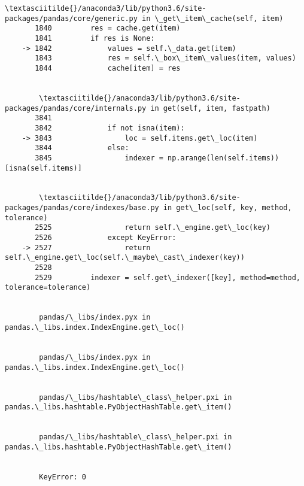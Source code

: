 \documentclass[11pt]{article}
\begin{document}
\begin{Verbatim}[commandchars=\\\{\}]
        \textasciitilde{}/anaconda3/lib/python3.6/site-packages/pandas/core/generic.py in \_get\_item\_cache(self, item)
       1840         res = cache.get(item)
       1841         if res is None:
    -> 1842             values = self.\_data.get(item)
       1843             res = self.\_box\_item\_values(item, values)
       1844             cache[item] = res


        \textasciitilde{}/anaconda3/lib/python3.6/site-packages/pandas/core/internals.py in get(self, item, fastpath)
       3841 
       3842             if not isna(item):
    -> 3843                 loc = self.items.get\_loc(item)
       3844             else:
       3845                 indexer = np.arange(len(self.items))[isna(self.items)]


        \textasciitilde{}/anaconda3/lib/python3.6/site-packages/pandas/core/indexes/base.py in get\_loc(self, key, method, tolerance)
       2525                 return self.\_engine.get\_loc(key)
       2526             except KeyError:
    -> 2527                 return self.\_engine.get\_loc(self.\_maybe\_cast\_indexer(key))
       2528 
       2529         indexer = self.get\_indexer([key], method=method, tolerance=tolerance)


        pandas/\_libs/index.pyx in pandas.\_libs.index.IndexEngine.get\_loc()


        pandas/\_libs/index.pyx in pandas.\_libs.index.IndexEngine.get\_loc()


        pandas/\_libs/hashtable\_class\_helper.pxi in pandas.\_libs.hashtable.PyObjectHashTable.get\_item()


        pandas/\_libs/hashtable\_class\_helper.pxi in pandas.\_libs.hashtable.PyObjectHashTable.get\_item()


        KeyError: 0

    \end{Verbatim}

    \begin{center}
    \end{center}
    { \hspace*{\fill} \\}
    

    
    
    
    
\end{document}
